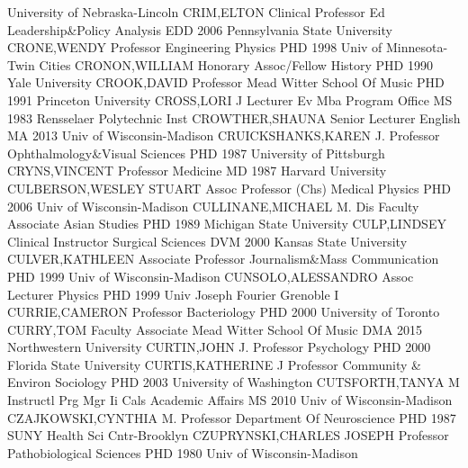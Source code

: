 \documentclass[
]{article}
\begin{document}
University of Nebraska-Lincoln \textbar CRIM,ELTON \textbar{}
 \textbar Clinical Professor \textbar Ed Leadership\&Policy
Analysis \textbar EDD 2006 Pennsylvania State University
\textbar CRONE,WENDY \textbar{}  \textbar Professor
\textbar Engineering Physics \textbar PHD 1998 Univ of Minnesota-Twin
Cities \textbar CRONON,WILLIAM \textbar{}  \textbar Honorary
Assoc/Fellow \textbar History \textbar PHD 1990 Yale University
\textbar CROOK,DAVID \textbar{}  \textbar Professor
\textbar Mead Witter School Of Music \textbar PHD 1991 Princeton
University \textbar CROSS,LORI J \textbar{} 
\textbar Lecturer \textbar Ev Mba Program Office \textbar MS 1983
Rensselaer Polytechnic Inst \textbar CROWTHER,SHAUNA \textbar{}
 \textbar Senior Lecturer \textbar English \textbar MA 2013
Univ of Wisconsin-Madison \textbar CRUICKSHANKS,KAREN J. \textbar{}
 \textbar Professor \textbar Ophthalmology\&Visual Sciences
\textbar PHD 1987 University of Pittsburgh \textbar CRYNS,VINCENT
\textbar{}  \textbar Professor \textbar Medicine \textbar MD
1987 Harvard University \textbar CULBERSON,WESLEY STUART \textbar{}
 \textbar Assoc Professor (Chs) \textbar Medical Physics
\textbar PHD 2006 Univ of Wisconsin-Madison \textbar CULLINANE,MICHAEL
M. \textbar{}  \textbar Dis Faculty Associate \textbar Asian
Studies \textbar PHD 1989 Michigan State University
\textbar CULP,LINDSEY \textbar{}  \textbar Clinical
Instructor \textbar Surgical Sciences \textbar DVM 2000 Kansas State
University \textbar CULVER,KATHLEEN \textbar{} 
\textbar Associate Professor \textbar Journalism\&Mass Communication
\textbar PHD 1999 Univ of Wisconsin-Madison \textbar CUNSOLO,ALESSANDRO
\textbar{}  \textbar Assoc Lecturer \textbar Physics
\textbar PHD 1999 Univ Joseph Fourier Grenoble I \textbar CURRIE,CAMERON
\textbar{}  \textbar Professor \textbar Bacteriology
\textbar PHD 2000 University of Toronto \textbar CURRY,TOM \textbar{}
 \textbar Faculty Associate \textbar Mead Witter School Of
Music \textbar DMA 2015 Northwestern University \textbar CURTIN,JOHN J.
\textbar{}  \textbar Professor \textbar Psychology
\textbar PHD 2000 Florida State University \textbar CURTIS,KATHERINE J
\textbar{}  \textbar Professor \textbar Community \& Environ
Sociology \textbar PHD 2003 University of Washington
\textbar CUTSFORTH,TANYA M \textbar{}  \textbar Instructl Prg
Mgr Ii \textbar Cals Academic Affairs \textbar MS 2010 Univ of
Wisconsin-Madison \textbar CZAJKOWSKI,CYNTHIA M. \textbar{} 
\textbar Professor \textbar Department Of Neuroscience \textbar PHD 1987
SUNY Health Sci Cntr-Brooklyn \textbar CZUPRYNSKI,CHARLES JOSEPH
\textbar{}  \textbar Professor \textbar Pathobiological
Sciences \textbar PHD 1980 Univ of Wisconsin-Madison \textbar{}
\end{document}
